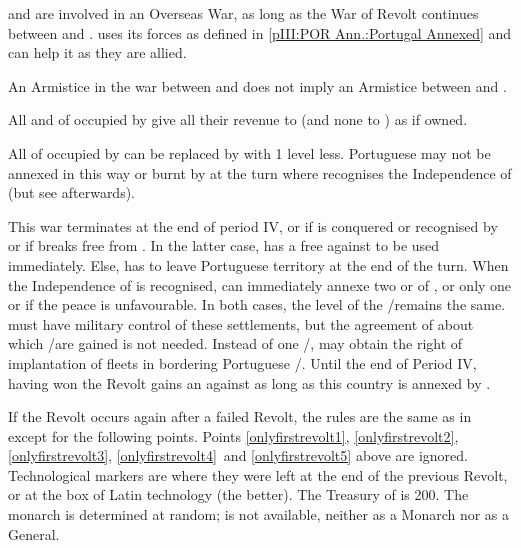 

\phevnt
\aparag \paysPortugal and \HOL are involved in an Overseas War, as long as the
War of Revolt continues between \SPA and \HOL.
\aparag \paysPortugal uses its forces as defined in \ref{pIII:POR
  Ann.:Portugal Annexed} and \SPA can help it as they are allied.

\phdipl
\aparag An Armistice in the war between \SPA and \HOL does not imply an
Armistice between \PORmin and \HOL.

\phadm
\aparag All \COL and \TP of \POR occupied by \HOL give all their revenue to
\HOL (and none to \SPA) as if owned.

\phinter
\aparag All \TP\facemoins of \POR occupied by \HOL can be replaced by \HOL \TP
with 1 level less.
\aparag Portuguese \TP may not be annexed in this way or burnt by \HOL at the
turn where \SPA recognises the Independence of \HOL (but see afterwards).

\phpaix
\aparag This war terminates at the end of period IV, or if \HOL is conquered
or recognised by \SPA or if \PORmin breaks free from \SPA. In the latter case,
\HOL has a free \OCB against \paysPortugal to be used immediately. Else, \HOL
has to leave Portuguese territory at the end of the turn.
\aparag When the Independence of \HOL is recognised, \HOL can immediately
annexe two \COL or \TP of \paysPortugal, or only one \COL or \TP if the peace
is unfavourable.  In both cases, the level of the \COL/\TP remains the
same. \HOL must have military control of these settlements, but the agreement
of \SPA about which \TP/\COL are gained is not needed.
\bparag Instead of one \TP/\COL, \HOL may obtain the right of implantation of
fleets in \STZ bordering Portuguese \COL/\TP.
\aparag Until the end of Period IV, \HOL having won the Revolt gains an \OCB
against \paysPortugal as long as this country is annexed by \SPA.



\phevnt
\aparag If the Revolt occurs again after a failed Revolt, the rules are the
same as in  except for the following
points.
\aparag Points \XNRofsectionfalse\ref{onlyfirstrevolt1},
\ref{onlyfirstrevolt2}, \ref{onlyfirstrevolt3},
\ref{onlyfirstrevolt4}\XNRofsectiontrue \ and \ref{onlyfirstrevolt5} above are
ignored.
\aparag Technological markers are where they were left at the end of the
previous Revolt, or at the box of Latin technology (the better). The Treasury
of \HOL is 200\ducats.  The monarch is determined at random;  is not available, neither as a Monarch nor as a General.


